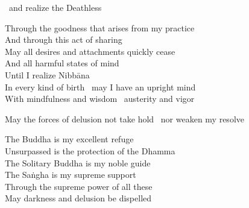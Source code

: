 \begin{english}
\begin{english-hang-inline}
  \breathmark\ and realize the Deathless\\
  \ifninebythirteen\end{english-hang-inline}\fi
  Through the goodness that arises from my practice\\
  And through this act of sharing\\
  May all desires and attachments quickly cease\\
  And all harmful states of mind\\
  Until I realize Nibbāna\\
  In every kind of birth \breathmark\ may I have an upright mind\\
  With mindfulness and wisdom \breathmark\ austerity and vigor\\
  \ifninebythirteen\begin{english-hang-inline}\fi
  May the forces of delusion\makeatletter\hyperlink{endnote135-appendix}\makeatother \thinspace
  not take hold \breathmark\ nor weaken my resolve\\
  \ifninebythirteen\end{english-hang-inline}\clearpage\fi
  The Buddha is my excellent refuge\\
  Unsurpassed is the protection of the Dhamma\\
  The Solitary Buddha is my noble guide\makeatletter\hyperlink{endnote136-appendix}\makeatother\\
  The Saṅgha is my supreme support\\
  Through the supreme power of all these\\
  May darkness and delusion be dispelled\makeatletter\hyperlink{endnote137-appendix}\makeatother
\end{english}

\ifbfive\vspace{-2pt}\fi

